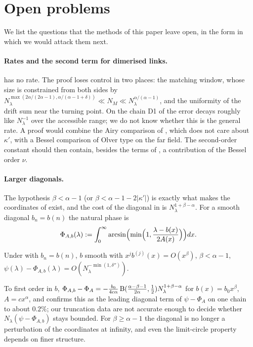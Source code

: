 \section{Open problems}\label{sec:open}

We list the questions that the methods of this paper leave open, in the form in which
we would attack them next.

\paragraph{Rates and the second term for dimerised links.}  has no rate. The
proof loses control in two places: the matching window, whose size is constrained from
both sides by $N_\lambda^{\max(2\alpha/(2\alpha-1),\alpha/(\alpha-1+\delta))}\ll N_M\ll N_\lambda^{\alpha/(\alpha-1)}$, and the
uniformity of the drift sum near the turning point. On the chain D1 of  the
error decays roughly like $N_\lambda^{-1}$ over the accessible range; we do not know whether this is the
general rate. A proof would combine the Airy comparison of
, which does not care about $\kappa'$, with a Bessel comparison of Olver type on
the far field. The second-order constant should then contain, besides the terms of
, a contribution of the Bessel order $\nu$.

\paragraph{Larger diagonals.} The hypothesis $\beta<\alpha-1$ (or $\beta<\alpha-1-2|\kappa'|$) is exactly what
makes the coordinates of  exist, and the cost of the diagonal in
 is $N_\lambda^{1+\beta-\alpha}$. For a smooth diagonal $b_n=b(n)$ the natural phase is
\[
  \Phi_{A,b}(\lambda):=\int_0^\infty\arcsin\Bigl(\min\Bigl(1,\frac{\lambda-b(x)}{2A(x)}\Bigr)\Bigr)dx .
\]
\begin{conjecture}\label{conj:AB}
Under  with $b_n=b(n)$, $b$ smooth with $x^jb^{(j)}(x)=O(x^\beta)$, $\beta<\alpha-1$,
$\psi(\lambda)-\Phi_{A,b}(\lambda)=O(N_\lambda^{-\min(1,\delta'')})$.
\end{conjecture}
\noindent To first order in $b$, $\Phi_{A,b}-\Phi_A=-\frac{b_0}{4c\alpha}\operatorname{B}(\frac{\alpha-\beta-1}{2\alpha},\frac12)N_\lambda^{1+\beta-\alpha}$
for $b(x)=b_0x^\beta$, $A=cx^\alpha$, and  confirms this as the leading diagonal
term of $\psi-\Phi_A$ on one chain to about $0.2\%$; our truncation data are not accurate enough to
decide whether $N_\lambda(\psi-\Phi_{A,b})$ stays bounded. For $\beta\ge\alpha-1$ the diagonal is no longer a
perturbation of the coordinates at infinity, and even the limit-circle property depends on
finer structure.

